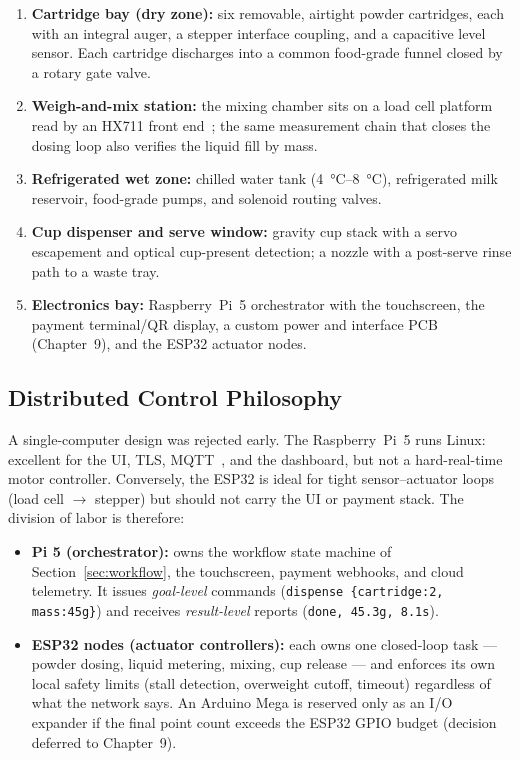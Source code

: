 \begin{enumerate}[itemsep=1pt]
  \item \textbf{Cartridge bay (dry zone):} six removable, airtight powder
        cartridges, each with an integral auger, a stepper interface
        coupling, and a capacitive level sensor. Each cartridge discharges
        into a common food-grade funnel closed by a rotary gate valve.
  \item \textbf{Weigh-and-mix station:} the mixing chamber sits on a load
        cell platform read by an HX711 front end~\cite{hx711datasheet};
        the same measurement chain that closes the dosing loop also verifies
        the liquid fill by mass.
  \item \textbf{Refrigerated wet zone:} chilled water tank
        (\SIrange{4}{8}{\celsius}), refrigerated milk reservoir, food-grade
        pumps, and solenoid routing valves.
  \item \textbf{Cup dispenser and serve window:} gravity cup stack with a
        servo escapement and optical cup-present detection; a nozzle with a
        post-serve rinse path to a waste tray.
  \item \textbf{Electronics bay:} Raspberry~Pi~5 orchestrator with the
        touchscreen, the payment terminal/QR display, a custom power and
        interface PCB (Chapter~9), and the ESP32 actuator nodes.
\end{enumerate}

\subsection{Distributed Control Philosophy}
\label{sec:controlphilosophy}

A single-computer design was rejected early. The Raspberry~Pi~5 runs Linux:
excellent for the UI, TLS, MQTT~\cite{oasis2019mqtt}, and the dashboard, but
not a hard-real-time motor controller. Conversely, the ESP32 is ideal for
tight sensor--actuator loops (load cell $\rightarrow$ stepper) but should not
carry the UI or payment stack. The division of labor is therefore:

\begin{itemize}[itemsep=1pt]
  \item \textbf{Pi 5 (orchestrator):} owns the workflow state machine of
        Section~\ref{sec:workflow}, the touchscreen, payment webhooks, and
        cloud telemetry. It issues \emph{goal-level} commands
        (\texttt{dispense \{cartridge:2, mass:45g\}}) and receives
        \emph{result-level} reports (\texttt{done, 45.3g, 8.1s}).
  \item \textbf{ESP32 nodes (actuator controllers):} each owns one
        closed-loop task --- powder dosing, liquid metering, mixing, cup
        release --- and enforces its own local safety limits (stall
        detection, overweight cutoff, timeout) regardless of what the
        network says. An Arduino Mega is reserved only as an I/O expander
        if the final point count exceeds the ESP32 GPIO budget
        (decision deferred to Chapter~9).
\end{itemize}

